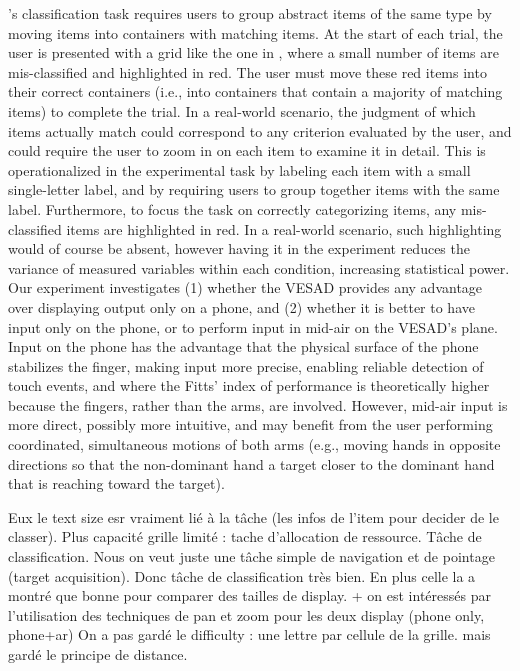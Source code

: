 \citeauthor{Liu2014}'s classification task requires users to group abstract items of the same type by moving items into containers with matching items. At the start of each trial, the user is presented with a grid like the one in , where a small number of items are mis-classified and highlighted in red. The user must move these red items into their correct containers (i.e., into containers that contain a majority of matching items) to complete the trial. In a real-world scenario, the judgment of which items actually match could correspond to any criterion evaluated by the user, and could require the user to zoom in on each item to examine it in detail. This is operationalized in the experimental task by labeling each item with a small single-letter label, and by requiring users to group together items with the same label. Furthermore, to focus the task on correctly categorizing items, any mis-classified items are highlighted in red. In a real-world scenario, such highlighting would of course be absent, however having it in the experiment reduces the variance of measured variables within each condition, increasing statistical power. Our experiment investigates (1) whether the VESAD provides any advantage over displaying output only on a phone, and (2) whether it is better to have input only on the phone, or to perform input in mid-air on the VESAD's plane. Input on the phone has the advantage that the physical surface of the phone stabilizes the finger, making input more precise, enabling reliable detection of touch events, and where the Fitts' index of performance is theoretically higher because the fingers, rather than the arms, are involved. However, mid-air input is more direct, possibly more intuitive, and may benefit from the user performing coordinated, simultaneous motions of both arms (e.g., moving hands in opposite directions so that the non-dominant hand  a target closer to the dominant hand that is reaching toward the target).

Eux le text size esr vraiment lié à la tâche (les infos de l'item pour decider de le classer). Plus capacité grille limité : tache d'allocation de ressource. Tâche de classification.
Nous on veut juste une tâche simple de navigation et de pointage (target acquisition). Donc tâche de classification très bien. En plus celle la a montré que bonne pour comparer des tailles de display. + on est intéressés par l'utilisation des techniques de pan et zoom pour les deux display (phone only, phone+ar)
On a pas gardé le difficulty : une lettre par cellule de la grille. mais gardé le principe de distance.

